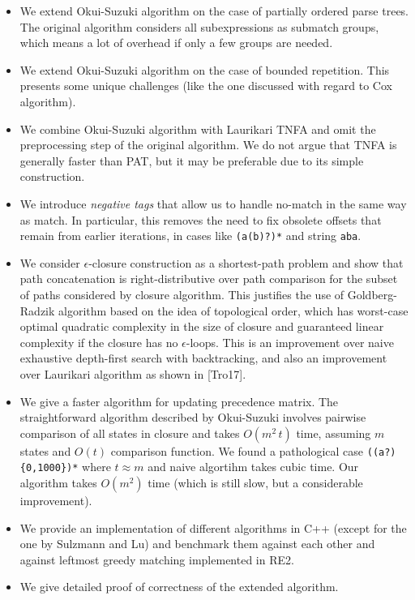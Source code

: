 \documentclass[AMA,STIX1COL]{WileyNJD-v2}
\begin{document}
\begin{itemize}[itemsep=0.5em]

    \item We extend Okui-Suzuki algorithm on the case of partially ordered parse trees.
        The original algorithm considers all subexpressions as submatch groups,
        which means a lot of overhead if only a few groups are needed.

    \item We extend Okui-Suzuki algorithm on the case of bounded repetition.
        This presents some unique challenges (like the one discussed with regard to Cox algorithm).

    \item We combine Okui-Suzuki algorithm with Laurikari TNFA
        and omit the preprocessing step of the original algorithm.
        We do not argue that TNFA is generally faster than PAT,
        but it may be preferable due to its simple construction.

    \item We introduce \emph{negative tags} that allow us to handle
        no-match in the same way as match.
        In particular, this removes the need to fix obsolete offsets that remain from earlier iterations,
        in cases like \texttt{(a(b)?)*} and string \texttt{aba}.

    \item We consider $\epsilon$-closure construction as a shortest-path problem
        and show that path concatenation is right-distributive over path comparison
        for the subset of paths considered by closure algorithm.
        This justifies the use of Goldberg-Radzik algorithm based on the idea of topological order,
        which has worst-case optimal quadratic complexity in the size of closure
        and guaranteed linear complexity if the closure has no $\epsilon$-loops.
        This is an improvement over naive exhaustive depth-first search with backtracking,
        and also an improvement over Laurikari algorithm as shown in [Tro17].

    \item We give a faster algorithm for updating precedence matrix.
        The straightforward algorithm described by Okui-Suzuki involves pairwise comparison of all states in closure
        and takes $O(m^2 \, t)$ time, assuming $m$ states and $O(t)$ comparison function.
        We found a pathological case \texttt{((a?)\{0,1000\})*} where $t \approx m$ and naive algortihm takes cubic time.
        Our algorithm takes $O(m^2)$ time (which is still slow, but a considerable improvement).

    \item We provide an implementation of different algorithms in C++ (except for the one by Sulzmann and Lu)
        and benchmark them against each other and against leftmost greedy matching implemented in RE2.

    \item We give detailed proof of correctness of the extended algorithm.
    \\
\end{itemize}
\end{document}

